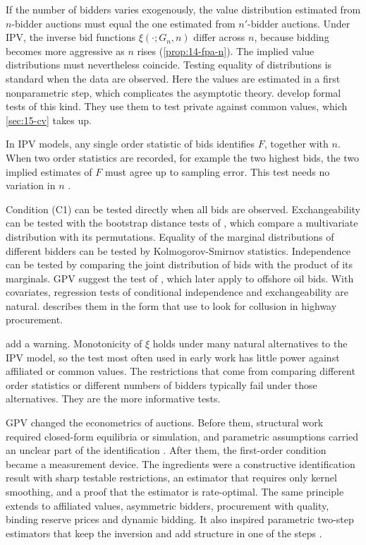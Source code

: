  If the number of bidders varies exogenously, the value distribution estimated from $n$-bidder auctions must equal the one estimated from $n'$-bidder auctions. Under IPV, the inverse bid functions $\xi(\cdot;G_n,n)$ differ across $n$, because bidding becomes more aggressive as $n$ rises (\cref{prop:14-fpa-n}). The implied value distributions must nevertheless coincide. Testing equality of distributions is standard when the data are observed. Here the values are estimated in a first nonparametric step, which complicates the asymptotic theory.  develop formal tests of this kind. They use them to test private against common values, which \cref{sec:15-cv} takes up.

 In IPV models, any single order statistic of bids identifies $F$, together with $n$. When two order statistics are recorded, for example the two highest bids, the two implied estimates of $F$ must agree up to sampling error. This test needs no variation in $n$ \citep[Section 5.4]{AtheyHaile2007}.

 Condition (C1) can be tested directly when all bids are observed. Exchangeability can be tested with the bootstrap distance tests of \citet{Romano1988,Romano1989}, which compare a multivariate distribution with its permutations. Equality of the marginal distributions of different bidders can be tested by Kolmogorov-Smirnov statistics. Independence can be tested by comparing the joint distribution of bids with the product of its marginals. GPV suggest the test of \citet{BlumKieferRosenblatt1961}, which \citet{CampoPerrigneVuong2003} later apply to offshore oil bids. With covariates, regression tests of conditional independence and exchangeability are natural.  describes them in the form that \citet{BajariYe2003} use to look for collusion in highway procurement.

\citet[p.~2123]{AtheyHaile2002} add a warning. Monotonicity of $\xi$ holds under many natural alternatives to the IPV model, so the test most often used in early work has little power against affiliated or common values. The restrictions that come from comparing different order statistics or different numbers of bidders typically fail under those alternatives. They are the more informative tests.

 GPV changed the econometrics of auctions. Before them, structural work required closed-form equilibria or simulation, and parametric assumptions carried an unclear part of the identification \citep[Section 3.1]{AtheyHaile2007}. After them, the first-order condition became a measurement device. The ingredients were a constructive identification result with sharp testable restrictions, an estimator that requires only kernel smoothing, and a proof that the estimator is rate-optimal. The same principle extends to affiliated values, asymmetric bidders, procurement with quality, binding reserve prices and dynamic bidding. It also inspired parametric two-step estimators that keep the inversion and add structure in one of the steps \citep[footnote 25]{GuerrePerrigneVuong2000}.


